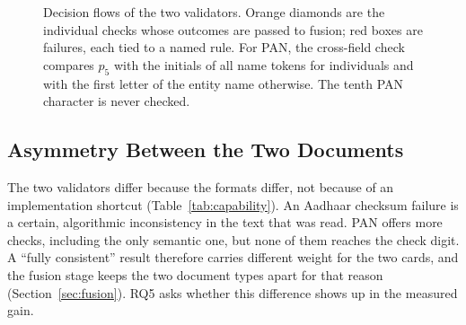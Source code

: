 \documentclass[conference]{IEEEtran}
\begin{document}
\begin{figure}[!t]
{}
\caption{Decision flows of the two validators. Orange diamonds are the
individual checks whose outcomes are passed to fusion; red boxes are
failures, each tied to a named rule. For PAN, the cross-field check
compares $p_5$ with the initials of all name tokens for individuals and
with the first letter of the entity name otherwise. The tenth PAN
character is never checked.}
\label{fig:flows}
\end{figure}

\subsection{Asymmetry Between the Two Documents}
\label{sec:asymmetry}

The two validators differ because the formats differ, not because of
an implementation shortcut (Table~\ref{tab:capability}). An Aadhaar
checksum failure is a certain, algorithmic inconsistency in the text
that was read. PAN offers more checks, including the only semantic one,
but none of them reaches the check digit. A ``fully consistent'' result
therefore carries different weight for the two cards, and the fusion
stage keeps the two document types apart for that reason
(Section~\ref{sec:fusion}). RQ5 asks whether this difference shows up in
the measured gain.
\end{document}
